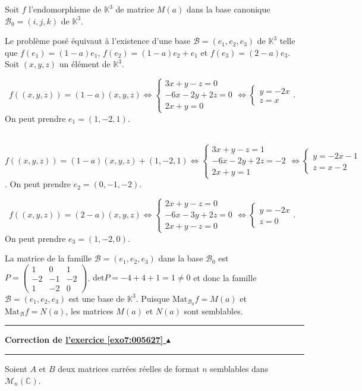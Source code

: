 \documentclass[11pt,a4paper]{article}
\newcommand{\Cc}{\mathbb{C}} \newcommand{\C}{\mathbb{C}}
\newcommand{\Kk}{\mathbb{K}} \newcommand{\K}{\mathbb{K}}
\newcounter{exo}
\newcommand{\correction}[1]{\hypertarget{cor7:#1}{}\label{cor7:#1}{\bf Correction de \hyperlink{exo7:#1}{l'exercice \ref{exo7:#1} $\blacktriangle$}}\vspace{1mm}\hrule\vspace{1mm}}
\newcommand{\fincorrection}{\vspace{1mm}\hrule\vspace*{7mm}}
\begin{document}
Soit $f$ l'endomorphisme de $\Kk^3$ de matrice $M(a)$ dans la base canonique $\mathcal{B}_0=(i,j,k)$ de $\Kk^3$.

Le problème posé équivaut à l'existence d'une base $\mathcal{B}=(e_1,e_2,e_3)$ de $\Kk^3$ telle que 
$f(e_1)=(1-a)e_1$, $f(e_2) =(1-a)e_2 +e_1$ et $f(e_3)= (2-a)e_3$. Soit $(x,y,z)$ un élément de $\Kk^3$.

\textbullet~$f((x,y,z)) =(1-a)(x,y,z)\Leftrightarrow\left\{
\begin{array}{l}
3x+y-z=0\\
-6x-2y+2z=0\\
2x+y=0
\end{array}
\right.\Leftrightarrow\left\{
\begin{array}{l}
y=-2x\\
z=x
\end{array}
\right.$. On peut prendre $e_1=(1,-2,1)$.

\textbullet~$f((x,y,z)) =(1-a)(x,y,z)+(1,-2,1)\Leftrightarrow\left\{
\begin{array}{l}
3x+y-z=1\\
-6x-2y+2z=-2\\
2x+y=1
\end{array}
\right.\Leftrightarrow\left\{
\begin{array}{l}
y=-2x-1\\
z=x-2
\end{array}
\right.$. On peut prendre $e_2=(0,-1,-2)$.

\textbullet~$f((x,y,z)) =(2-a)(x,y,z)\Leftrightarrow\left\{
\begin{array}{l}
2x+y-z=0\\
-6x-3y+2z=0\\
2x+y-z=0
\end{array}
\right.\Leftrightarrow\left\{
\begin{array}{l}
y=-2x\\
z=0
\end{array}
\right.$. On peut prendre $e_3=(1,-2,0)$.

La matrice de la famille $\mathcal{B}=(e_1,e_2,e_3)$ dans la base $\mathcal{B}_0$ est $P=\left(
\begin{array}{ccc}
1&0&1\\
-2&-1&-2\\
1&-2&0
\end{array}
\right)$. $\text{det}P=-4+4+1 =1\neq 0$ et donc la famille $\mathcal{B}=(e_1,e_2,e_3)$ est une base de $\Kk^3$. Puisque $\text{Mat}_{\mathcal{B}_0}f=
M(a)$ et $\text{Mat}_{\mathcal{B}}f=N(a)$, les matrices $M(a)$ et $N(a)$ sont semblables.
\fincorrection
\correction{005627}
Soient $A$ et $B$ deux matrices carrées réelles de format $n$ semblables dans $\mathcal{M}_n(\Cc)$.
\end{document}
